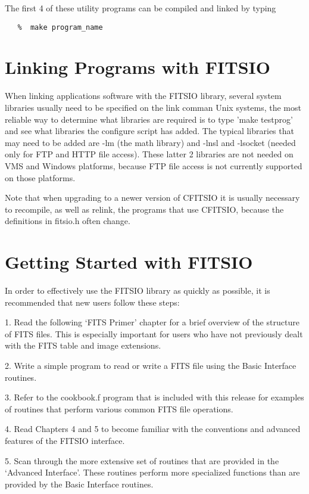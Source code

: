 \documentclass[11pt]{book}
\begin{document}
The first 4 of these utility programs can be compiled and linked by typing

\begin{verbatim}
   %  make program_name
\end{verbatim}


\section{Linking Programs with FITSIO}

When linking applications software with the FITSIO library, several system libraries usually need to be specified on the link comman
Unix systems, the most reliable way to determine what libraries are required
is to type 'make testprog' and see what libraries the configure script has
added.  The typical libraries that may need to be added are -lm (the math
library) and -lnsl and -lsocket (needed only for FTP and HTTP file access).
These latter 2 libraries are not needed on VMS and Windows platforms,
because FTP file access is not currently supported on those platforms.

Note that when upgrading to a newer version of CFITSIO it is usually
necessary to recompile, as well as relink, the programs that use CFITSIO,
because the definitions in fitsio.h often change.


\section{Getting Started with FITSIO}

In order to effectively use the FITSIO library as quickly as possible,
it is recommended that new users follow these steps:

1.  Read the following `FITS Primer' chapter for a brief
overview of the structure of FITS files.  This is especially important
for users who have not previously dealt with the FITS table and image
extensions.

2.  Write a simple program to read or write a FITS file using the Basic
Interface routines.

3.  Refer to the cookbook.f program that is included with this release
for examples of routines that perform various common FITS file
operations.

4. Read Chapters 4 and 5 to become familiar with the conventions and
advanced features of the FITSIO interface.

5.  Scan through the more extensive set of routines that are provided
in the `Advanced Interface'.  These routines perform more specialized
functions than are provided by the Basic Interface routines.
\end{document}
